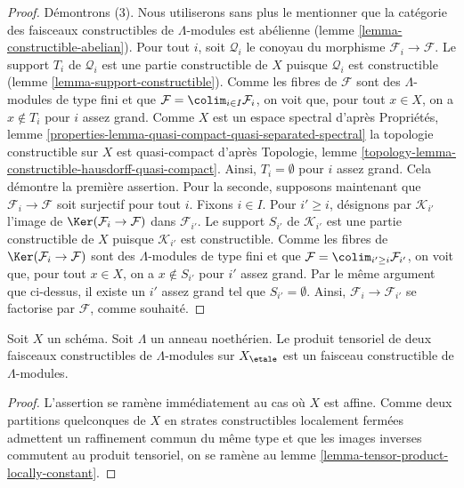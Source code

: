\begin{proof}
\medskip\noindent
Démontrons (3). Nous utiliserons sans plus le mentionner que la catégorie des
faisceaux constructibles de $\Lambda$-modules est abélienne
(lemme \ref{lemma-constructible-abelian}).
Pour tout $i$, soit $\mathcal{Q}_i$ le conoyau du morphisme
$\mathcal{F}_i \to \mathcal{F}$. Le support $T_i$ de $\mathcal{Q}_i$
est une partie constructible de $X$ puisque $\mathcal{Q}_i$ est constructible
(lemme \ref{lemma-support-constructible}).
Comme les fibres de $\mathcal{F}$ sont des $\Lambda$-modules de type fini
et que $\mathcal{F} = \colim_{i \in I} \mathcal{F}_i$, on voit
que, pour tout $x \in X$, on a $x \not \in T_i$ pour $i$ assez grand.
Comme $X$ est un espace spectral d'après Propriétés, lemme
\ref{properties-lemma-quasi-compact-quasi-separated-spectral}
la topologie constructible sur $X$ est quasi-compact d'après
Topologie, lemme \ref{topology-lemma-constructible-hausdorff-quasi-compact}.
Ainsi, $T_i = \emptyset$ pour $i$ assez grand. Cela démontre la première
assertion. Pour la seconde, supposons maintenant que
$\mathcal{F}_i \to \mathcal{F}$ soit surjectif pour tout $i$.
Fixons $i \in I$. Pour $i' \geq i$, désignons par $\mathcal{K}_{i'}$
l'image de $\Ker(\mathcal{F}_i \to \mathcal{F})$ dans $\mathcal{F}_{i'}$.
Le support $S_{i'}$ de $\mathcal{K}_{i'}$
est une partie constructible de $X$ puisque $\mathcal{K}_{i'}$ est constructible.
Comme les fibres de $\Ker(\mathcal{F}_i \to \mathcal{F})$
sont des $\Lambda$-modules de type fini et que
$\mathcal{F} = \colim_{i' \geq i} \mathcal{F}_{i'}$, on voit
que, pour tout $x \in X$, on a $x \not \in S_{i'}$ pour $i'$ assez grand.
Par le même argument que ci-dessus, il existe un $i'$ assez grand
tel que $S_{i'} = \emptyset$. Ainsi, $\mathcal{F}_i \to \mathcal{F}_{i'}$
se factorise par $\mathcal{F}$, comme souhaité.
\end{proof}

\begin{lemma}
\label{lemma-tensor-product-constructible}
Soit $X$ un schéma. Soit $\Lambda$ un anneau noethérien.
Le produit tensoriel de deux faisceaux constructibles de $\Lambda$-modules
sur $X_\etale$ est un faisceau constructible de $\Lambda$-modules.
\end{lemma}

\begin{proof}
L'assertion se ramène immédiatement au cas où $X$ est affine.
Comme deux partitions quelconques de $X$ en strates constructibles localement
fermées admettent un raffinement commun du même type et
que les images inverses commutent au produit tensoriel, on se ramène au
lemme \ref{lemma-tensor-product-locally-constant}.
\end{proof}

